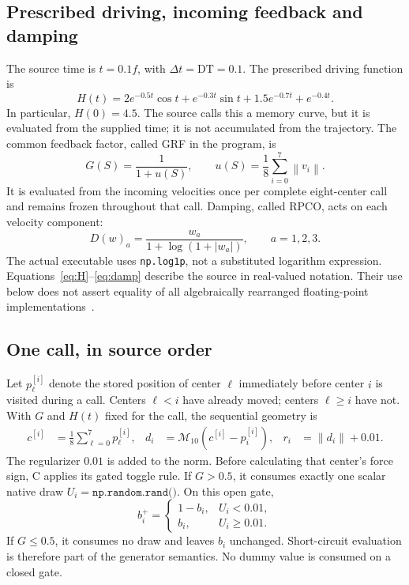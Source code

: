 \documentclass[11pt,a4paper]{article}
\newcommand{\norm}[1]{\left\lVert #1\right\rVert}
\newcommand{\mi}{\mathcal M_{10}}
\begin{document}
\subsection{Prescribed driving, incoming feedback and damping}
The source time is $t=0.1f$, with $\Delta t=\mathrm{DT}=0.1$. The prescribed driving function is
\begin{equation}
 H(t)=2e^{-0.5t}\cos t+e^{-0.3t}\sin t+1.5e^{-0.7t}+e^{-0.4t}.
 \label{eq:H}
\end{equation}
In particular, $H(0)=4.5$. The source calls this a memory curve, but it is evaluated from the supplied time; it is not accumulated from the trajectory. The common feedback factor, called GRF in the program, is
\begin{equation}
 G(S)=\frac{1}{1+u(S)},\qquad u(S)=\frac18\sum_{i=0}^7\norm{v_i}.
 \label{eq:G}
\end{equation}
It is evaluated from the incoming velocities once per complete eight-center call and remains frozen throughout that call. Damping, called RPCO, acts on each velocity component:
\begin{equation}
 D(w)_a=\frac{w_a}{1+\log(1+|w_a|)},\qquad a=1,2,3.
 \label{eq:damp}
\end{equation}
The actual executable uses \texttt{np.log1p}, not a substituted logarithm expression. Equations~\eqref{eq:H}--\eqref{eq:damp} describe the source in real-valued notation. Their use below does not assert equality of all algebraically rearranged floating-point implementations~\cite{source}.

\subsection{One call, in source order}
\label{sec:order}
Let $p^{[i]}_\ell$ denote the stored position of center $\ell$ immediately before center $i$ is visited during a call. Centers $\ell<i$ have already moved; centers $\ell\geq i$ have not. With $G$ and $H(t)$ fixed for the call, the sequential geometry is
\begin{align}
 c^{[i]}&=\frac18\sum_{\ell=0}^7p^{[i]}_\ell,
 & d_i&=\mi\!\left(c^{[i]}-p_i^{[i]}\right),
 & r_i&=\norm{d_i}+0.01.
 \label{eq:centroid}
\end{align}
The regularizer $0.01$ is added to the norm. Before calculating that center's force sign, C applies its gated toggle rule. If $G>0.5$, it consumes exactly one scalar native draw $U_i=\texttt{np.random.rand()}$. On this open gate,
\begin{equation}
 b_i^+=\begin{cases}1-b_i,&U_i<0.01,\\ b_i,&U_i\geq0.01.\end{cases}
 \label{eq:toggle}
\end{equation}
If $G\leq0.5$, it consumes no draw and leaves $b_i$ unchanged. Short-circuit evaluation is therefore part of the generator semantics. No dummy value is consumed on a closed gate.
\end{document}
